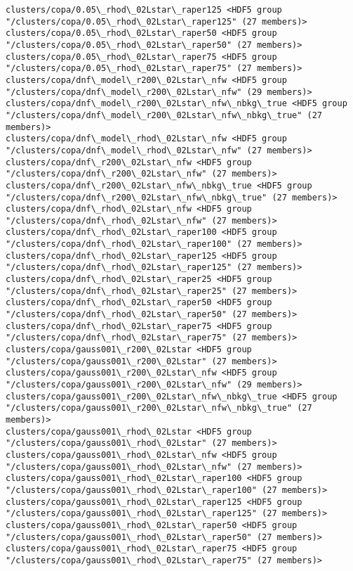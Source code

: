 \documentclass[11pt]{article}
\begin{document}
\begin{Verbatim}[commandchars=\\\{\}]
clusters/copa/0.05\_rhod\_02Lstar\_raper125 <HDF5 group "/clusters/copa/0.05\_rhod\_02Lstar\_raper125" (27 members)>
clusters/copa/0.05\_rhod\_02Lstar\_raper50 <HDF5 group "/clusters/copa/0.05\_rhod\_02Lstar\_raper50" (27 members)>
clusters/copa/0.05\_rhod\_02Lstar\_raper75 <HDF5 group "/clusters/copa/0.05\_rhod\_02Lstar\_raper75" (27 members)>
clusters/copa/dnf\_model\_r200\_02Lstar\_nfw <HDF5 group "/clusters/copa/dnf\_model\_r200\_02Lstar\_nfw" (29 members)>
clusters/copa/dnf\_model\_r200\_02Lstar\_nfw\_nbkg\_true <HDF5 group "/clusters/copa/dnf\_model\_r200\_02Lstar\_nfw\_nbkg\_true" (27 members)>
clusters/copa/dnf\_model\_rhod\_02Lstar\_nfw <HDF5 group "/clusters/copa/dnf\_model\_rhod\_02Lstar\_nfw" (27 members)>
clusters/copa/dnf\_r200\_02Lstar\_nfw <HDF5 group "/clusters/copa/dnf\_r200\_02Lstar\_nfw" (27 members)>
clusters/copa/dnf\_r200\_02Lstar\_nfw\_nbkg\_true <HDF5 group "/clusters/copa/dnf\_r200\_02Lstar\_nfw\_nbkg\_true" (27 members)>
clusters/copa/dnf\_rhod\_02Lstar\_nfw <HDF5 group "/clusters/copa/dnf\_rhod\_02Lstar\_nfw" (27 members)>
clusters/copa/dnf\_rhod\_02Lstar\_raper100 <HDF5 group "/clusters/copa/dnf\_rhod\_02Lstar\_raper100" (27 members)>
clusters/copa/dnf\_rhod\_02Lstar\_raper125 <HDF5 group "/clusters/copa/dnf\_rhod\_02Lstar\_raper125" (27 members)>
clusters/copa/dnf\_rhod\_02Lstar\_raper25 <HDF5 group "/clusters/copa/dnf\_rhod\_02Lstar\_raper25" (27 members)>
clusters/copa/dnf\_rhod\_02Lstar\_raper50 <HDF5 group "/clusters/copa/dnf\_rhod\_02Lstar\_raper50" (27 members)>
clusters/copa/dnf\_rhod\_02Lstar\_raper75 <HDF5 group "/clusters/copa/dnf\_rhod\_02Lstar\_raper75" (27 members)>
clusters/copa/gauss001\_r200\_02Lstar <HDF5 group "/clusters/copa/gauss001\_r200\_02Lstar" (27 members)>
clusters/copa/gauss001\_r200\_02Lstar\_nfw <HDF5 group "/clusters/copa/gauss001\_r200\_02Lstar\_nfw" (29 members)>
clusters/copa/gauss001\_r200\_02Lstar\_nfw\_nbkg\_true <HDF5 group "/clusters/copa/gauss001\_r200\_02Lstar\_nfw\_nbkg\_true" (27 members)>
clusters/copa/gauss001\_rhod\_02Lstar <HDF5 group "/clusters/copa/gauss001\_rhod\_02Lstar" (27 members)>
clusters/copa/gauss001\_rhod\_02Lstar\_nfw <HDF5 group "/clusters/copa/gauss001\_rhod\_02Lstar\_nfw" (27 members)>
clusters/copa/gauss001\_rhod\_02Lstar\_raper100 <HDF5 group "/clusters/copa/gauss001\_rhod\_02Lstar\_raper100" (27 members)>
clusters/copa/gauss001\_rhod\_02Lstar\_raper125 <HDF5 group "/clusters/copa/gauss001\_rhod\_02Lstar\_raper125" (27 members)>
clusters/copa/gauss001\_rhod\_02Lstar\_raper50 <HDF5 group "/clusters/copa/gauss001\_rhod\_02Lstar\_raper50" (27 members)>
clusters/copa/gauss001\_rhod\_02Lstar\_raper75 <HDF5 group "/clusters/copa/gauss001\_rhod\_02Lstar\_raper75" (27 members)>

\end{Verbatim}
\end{document}

